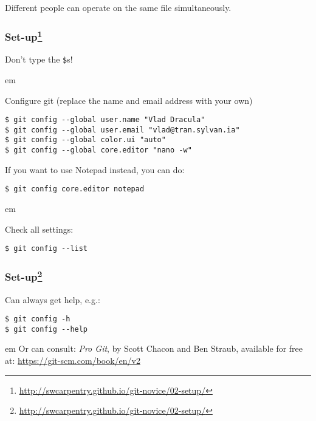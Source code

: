 \documentclass[aspectratio=1610]{beamer}
\begin{document}
\begin{frame}
{\begin{minipage}{\textwidth}
\begin{tikzpicture}[y=0.80pt,x=0.80pt,yscale=-1, inner sep=0pt, outer sep=0pt]
  \end{tikzpicture}
\end{minipage}
}
\pause

Different people can operate on the same file simultaneously.

\end{frame}

\begin{frame}[fragile]
\frametitle{Set-up\footnote{\url{http://swcarpentry.github.io/git-novice/02-setup/}}}

\textcolor{red!50!black}{Don't type the \texttt{\$}s!}

 em

Configure git (replace the name and email address with your own)
\begin{verbatim}
$ git config --global user.name "Vlad Dracula"
$ git config --global user.email "vlad@tran.sylvan.ia"
$ git config --global color.ui "auto"
$ git config --global core.editor "nano -w"
\end{verbatim}

If you want to use Notepad instead, you can do:
\begin{verbatim}
$ git config core.editor notepad
\end{verbatim}

\pause

 em

Check all settings:
\begin{verbatim}
$ git config --list
\end{verbatim}

\end{frame}

\begin{frame}[fragile]
\frametitle{Set-up\footnote{\url{http://swcarpentry.github.io/git-novice/02-setup/}}}

Can always get help, e.g.:
\begin{verbatim}
$ git config -h
$ git config --help
\end{verbatim}

 em
Or can consult: \textit{Pro Git}, by Scott Chacon and Ben Straub, available for free at: \url{https://git-scm.com/book/en/v2}

\end{frame}
\end{document}
